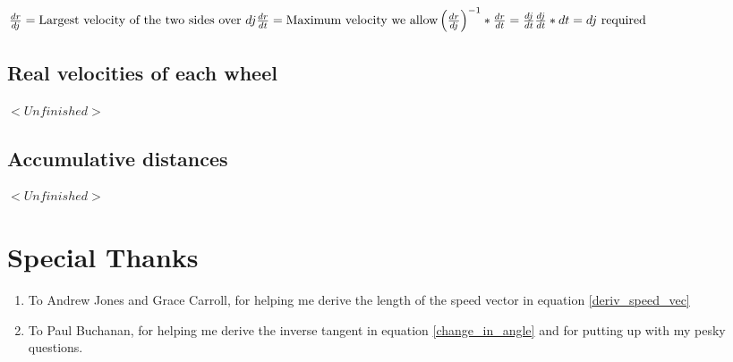 \documentclass[12pt, english]{article}
\begin{document}
\noindent
\begin{math}
	\frac{dr}{dj} = 
	\text{Largest velocity of the two sides over } dj\\
	\\
	\frac{dr}{dt} = \text{Maximum velocity we allow} \\
	\\
	\left(\frac{dr}{dj}\right)^{-1} * \frac{dr}{dt} = \frac{dj}{dt} \\
	\\
	\frac{dj}{dt} * dt = dj \text{ required}
\end{math}

\subsection{Real velocities of each wheel}
$<Unfinished>$
\subsection{Accumulative distances}
$<Unfinished>$

\section{Special Thanks}
\begin{enumerate}
	\item To Andrew Jones and Grace Carroll, for helping me derive the length of the speed vector in equation \ref{deriv_speed_vec}
	\item To Paul Buchanan, for helping me derive the inverse tangent in equation \ref{change_in_angle} and for putting up with my pesky questions.
\end{enumerate}
\end{document}
